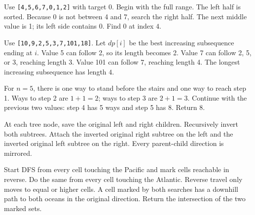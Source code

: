 \expandafter\def\csname lessontrace@71\endcsname{\visualtrace
  {Use \texttt{[4,5,6,7,0,1,2]} with target 0. Begin with the full range.}
  {The left half is sorted. Because 0 is not between 4 and 7, search the right half.}
  {The next middle value is 1; its left side contains 0.}
  {Find 0 at index \(4\).}}

\expandafter\def\csname lessontrace@72\endcsname{\visualtrace
  {Use \texttt{[10,9,2,5,3,7,101,18]}. Let \(dp[i]\) be the best increasing subsequence ending at \(i\).}
  {Value 5 can follow 2, so its length becomes 2. Value 7 can follow 2, 5, or 3, reaching length 3.}
  {Value 101 can follow 7, reaching length 4.}
  {The longest increasing subsequence has length \(4\).}}

\expandafter\def\csname lessontrace@73\endcsname{\visualtrace
  {For \(n=5\), there is one way to stand before the stairs and one way to reach step 1.}
  {Ways to step 2 are \(1+1=2\); ways to step 3 are \(2+1=3\).}
  {Continue with the previous two values: step 4 has 5 ways and step 5 has 8.}
  {Return \(8\).}}

\expandafter\def\csname lessontrace@74\endcsname{\visualtrace
  {At each tree node, save the original left and right children.}
  {Recursively invert both subtrees.}
  {Attach the inverted original right subtree on the left and the inverted original left subtree on the right.}
  {Every parent-child direction is mirrored.}}

\expandafter\def\csname lessontrace@75\endcsname{\visualtrace
  {Start DFS from every cell touching the Pacific and mark cells reachable in reverse.}
  {Do the same from every cell touching the Atlantic. Reverse travel only moves to equal or higher cells.}
  {A cell marked by both searches has a downhill path to both oceans in the original direction.}
  {Return the intersection of the two marked sets.}}